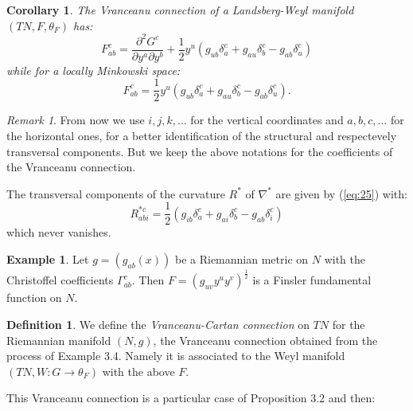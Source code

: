 \documentclass[11pt,oneside,english]{amsart}
\numberwithin{equation}{section}
\numberwithin{figure}{section}
\theoremstyle{plain}
\theoremstyle{definition}
\newtheorem{defn}[thm]{Definition}
\theoremstyle{definition}
\newtheorem{example}[thm]{Example}
\theoremstyle{plain}
\theoremstyle{plain}
\newtheorem{cor}[thm]{Corollary}
\theoremstyle{remark}
\newtheorem*{rem*}{Remark}
\theoremstyle{remark}
\begin{document}
\begin{cor}
The Vranceanu connection of a Landsberg-Weyl manifold $(TN,F,\theta_{F})$
has: \begin{equation}
F_{ab}^{c}=\frac{\partial^{2}G^{c}}{\partial y^{a}\partial y^{b}}+\frac{1}{2}y^{u}\left(g_{ub}\delta_{a}^{c}+g_{au}\delta_{b}^{c}-g_{ab}\delta_{u}^{c}\right)\label{eq:45}\end{equation}
 while for a locally Minkowski space: \begin{equation}
F_{ab}^{c}=\frac{1}{2}y^{u}\left(g_{ub}\delta_{a}^{c}+g_{au}\delta_{b}^{c}-g_{ab}\delta_{u}^{c}\right).\label{eq:46}\end{equation}

\end{cor}
\begin{rem*}
From now we use $i,j,k,...$ for the vertical coordinates and $a,b,c,...$
for the horizontal ones, for a better identification of the structural
and respectevely transversal components. But we keep the above notations
for the coefficients of the Vranceanu connection.
\end{rem*}
The transversal components of the curvature $R^{*}$ of $\nabla^{*}$
are given by (\ref{eq:25}) with: \begin{equation}
R_{abi}^{*c}=\frac{1}{2}(g_{ib}\delta_{a}^{c}+g_{ai}\delta_{b}^{c}-g_{ab}\delta_{i}^{c})\label{eq:47}\end{equation}
 which never vanishes. 

\medskip{}

\begin{example}
Let $g=(g_{ab}(x))$ be a Riemannian metric on $N$ with the Christoffel
coefficients $\Gamma_{ab}^{c}$. Then $F=\left(g_{uv}y^{u}y^{v}\right)^{\frac{1}{2}}$
is a Finsler fundamental function on $N$.
\end{example}
\medskip{}

\begin{defn}
We define the \textit{Vranceanu-Cartan connection} on $TN$ for the
Riemannian manifold $(N,g)$, the Vranceanu connection obtained from
the process of Example 3.4. Namely it is associated to the Weyl manifold
$(TN,W:G\rightarrow\theta_{F})$ with the above $F$.
\end{defn}
\medskip{}

This Vranceanu connection is a particular case of Proposition 3.2
and then:

\medskip{}
\end{document}
